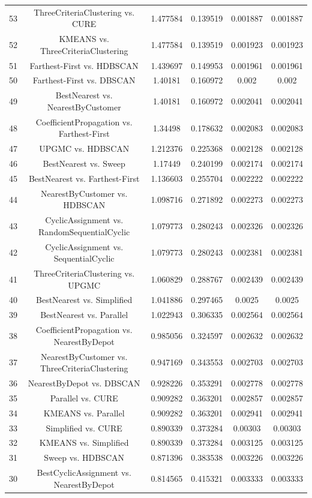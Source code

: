 \documentclass[a4paper,10pt]{article}
\begin{document}
\begin{landscape}
\begin{table}[!htp]
\begin{tabular}{cccccc}
53&ThreeCriteriaClustering vs. CURE&1.477584&0.139519&0.001887&0.001887\\
52&KMEANS vs. ThreeCriteriaClustering&1.477584&0.139519&0.001923&0.001923\\
51&Farthest-First vs. HDBSCAN&1.439697&0.149953&0.001961&0.001961\\
50&Farthest-First vs. DBSCAN&1.40181&0.160972&0.002&0.002\\
49&BestNearest vs. NearestByCustomer&1.40181&0.160972&0.002041&0.002041\\
48&CoefficientPropagation vs. Farthest-First&1.34498&0.178632&0.002083&0.002083\\
47&UPGMC vs. HDBSCAN&1.212376&0.225368&0.002128&0.002128\\
46&BestNearest vs. Sweep&1.17449&0.240199&0.002174&0.002174\\
45&BestNearest vs. Farthest-First&1.136603&0.255704&0.002222&0.002222\\
44&NearestByCustomer vs. HDBSCAN&1.098716&0.271892&0.002273&0.002273\\
43&CyclicAssignment vs. RandomSequentialCyclic&1.079773&0.280243&0.002326&0.002326\\
42&CyclicAssignment vs. SequentialCyclic&1.079773&0.280243&0.002381&0.002381\\
41&ThreeCriteriaClustering vs. UPGMC&1.060829&0.288767&0.002439&0.002439\\
40&BestNearest vs. Simplified&1.041886&0.297465&0.0025&0.0025\\
39&BestNearest vs. Parallel&1.022943&0.306335&0.002564&0.002564\\
38&CoefficientPropagation vs. NearestByDepot&0.985056&0.324597&0.002632&0.002632\\
37&NearestByCustomer vs. ThreeCriteriaClustering&0.947169&0.343553&0.002703&0.002703\\
36&NearestByDepot vs. DBSCAN&0.928226&0.353291&0.002778&0.002778\\
35&Parallel vs. CURE&0.909282&0.363201&0.002857&0.002857\\
34&KMEANS vs. Parallel&0.909282&0.363201&0.002941&0.002941\\
33&Simplified vs. CURE&0.890339&0.373284&0.00303&0.00303\\
32&KMEANS vs. Simplified&0.890339&0.373284&0.003125&0.003125\\
31&Sweep vs. HDBSCAN&0.871396&0.383538&0.003226&0.003226\\
30&BestCyclicAssignment vs. NearestByDepot&0.814565&0.415321&0.003333&0.003333\\

\end{tabular}
\end{table}
\end{landscape}
\end{document}
